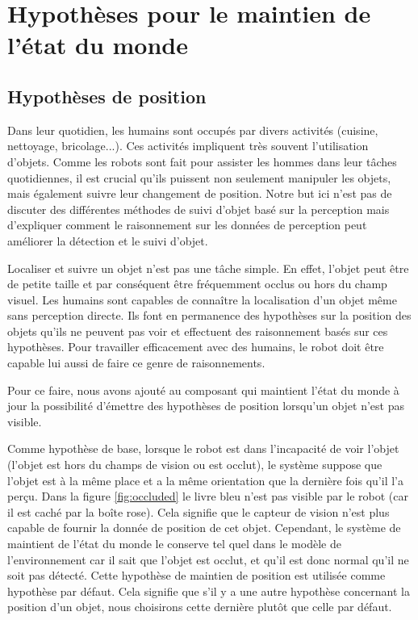\documentclass[a4paper,11pt,twoside]{StyleThese}
\begin{document}
\section{Hypothèses pour le maintien de l'état du monde}
\label{sec:hypo}
\subsection{Hypothèses de position}


Dans leur quotidien, les humains sont occupés par divers activités (cuisine, nettoyage, bricolage...). Ces activités impliquent très souvent l'utilisation d'objets. Comme les robots sont fait pour assister les hommes dans leur tâches quotidiennes, il est crucial qu'ils puissent non seulement manipuler les objets, mais également suivre leur changement de position. Notre but ici n'est pas de discuter des différentes méthodes de suivi d'objet basé sur la perception mais d'expliquer comment le raisonnement sur les données de perception peut améliorer la détection et le suivi d'objet.

Localiser et suivre un objet n'est pas une tâche simple. En effet, l'objet peut être de petite taille et par conséquent être fréquemment occlus ou hors du champ visuel.
Les humains sont capables de connaître la localisation d'un objet même sans perception directe. Ils font en permanence des hypothèses sur la position des objets qu'ils ne peuvent pas voir et effectuent des raisonnement basés sur ces hypothèses. Pour travailler efficacement avec des humains, le robot doit être capable lui aussi de faire ce genre de raisonnements.

Pour ce faire, nous avons ajouté au composant qui maintient l'état du monde à jour la possibilité d'émettre des hypothèses de position lorsqu'un objet n'est pas visible.

Comme hypothèse de base, lorsque le robot est dans l'incapacité de voir l'objet (l'objet est hors du champs de vision ou est occlut), le système suppose que l'objet est à la même place et a la même orientation que la dernière fois qu'il l'a perçu. Dans la figure \ref{fig:occluded} 
le livre bleu n'est pas visible par le robot (car il est caché par la boîte rose). Cela signifie que le capteur de vision n'est plus capable de fournir la donnée de position de cet objet. Cependant, le système de maintient de l'état du monde le conserve tel quel dans le modèle de l'environnement car il sait que l'objet est occlut, et qu'il est donc normal qu'il ne soit pas détecté. Cette hypothèse de maintien de position est utilisée comme hypothèse par défaut. Cela signifie que s'il y a une autre hypothèse concernant la position d'un objet, nous choisirons cette dernière plutôt que celle par défaut.
\end{document}
